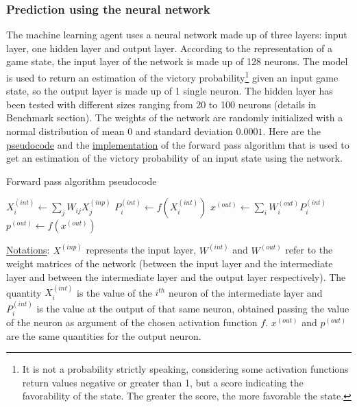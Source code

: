 \documentclass{article}
\begin{document}
\subsubsection{Prediction using the neural network}

The machine learning agent uses a neural network made up of three layers: input layer, one hidden layer and output layer. According to the representation of a game state, the input layer of the network is made up of 128 neurons. The model is used to return an estimation of the victory probability\footnote{It is not a probability strictly speaking, considering some activation functions return values negative or greater than 1, but a score indicating the favorability of the state. The greater the score, the more favorable the state.} given an input game state, so the output layer is made up of 1 single neuron. The hidden layer has been tested with different sizes ranging from 20 to 100 neurons (details in Benchmark section). The weights of the network are randomly initialized with a normal distribution of mean $0$ and standard deviation $0.0001$. Here are the \hyperref[alg:fp-pseudo]{pseudocode} and the \hyperref[code:fp-code]{implementation} of the forward pass algorithm that is used to get an estimation of the victory probability of an input state using the network.

\begin{algorithm}[H]
	\caption{Forward pass algorithm pseudocode}
    \label{alg:fp-pseudo}
	\begin{algorithmic}[1]
		    \State $X_{i}^{(int)} \leftarrow \sum_{j}{W_{ij} X_{j}^{(inp)}}$
		    \State $P_{i}^{(int)} \leftarrow f(X_{i}^{(int)})$
		\EndFor
		\State $x^{(out)} \leftarrow \sum_{i}{W_{i}^{(out)}P_ {i}^{(int)}}$
		\State $p^{(out)} \leftarrow f(x^{(out)})$
	\end{algorithmic}
\end{algorithm}

\underline{Notations}: $X^{(inp)}$ represents the input layer, $W^{(int)}$ and $W^{(out)}$ refer to the weight matrices of the network (between the input layer and the intermediate layer and between the intermediate layer and the output layer respectively). The quantity $X_{i}^{(int)}$ is the value of the $i^{th}$ neuron of the intermediate layer and $P_{i}^{(int)}$ is the value at the output of that same neuron, obtained passing the value of the neuron as argument of the chosen activation function $f$. $x^{(out)}$ and $p^{(out)}$ are the same quantities for the output neuron.
\end{document}
